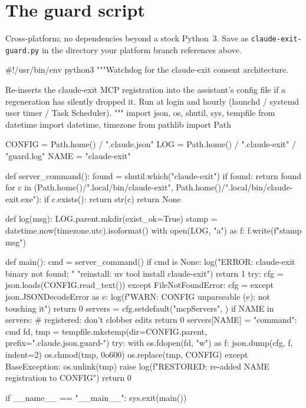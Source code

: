 \documentclass[11pt]{article}
\newenvironment{code}%
  {\quote\small\verbatim}%
  {\endverbatim\endquote}
\begin{document}
\section{The guard script}\label{app:guard}

Cross-platform; no dependencies beyond a stock Python~3.  Save as
\texttt{claude-exit-guard.py} in the directory your platform branch
references above.

\begin{code}
#!/usr/bin/env python3
"""Watchdog for the claude-exit consent architecture.

Re-inserts the claude-exit MCP registration into the assistant's
config file if a regeneration has silently dropped it. Run at login
and hourly (launchd / systemd user timer / Task Scheduler).
"""
import json, os, shutil, sys, tempfile
from datetime import datetime, timezone
from pathlib import Path

CONFIG = Path.home() / ".claude.json"
LOG    = Path.home() / ".claude-exit" / "guard.log"
NAME   = "claude-exit"

def server_command():
    found = shutil.which("claude-exit")
    if found:
        return found
    for c in (Path.home()/".local/bin/claude-exit",
              Path.home()/".local/bin/claude-exit.exe"):
        if c.exists():
            return str(c)
    return None

def log(msg):
    LOG.parent.mkdir(exist_ok=True)
    stamp = datetime.now(timezone.utc).isoformat()
    with open(LOG, "a") as f:
        f.write(f"{stamp} {msg}\n")

def main():
    cmd = server_command()
    if cmd is None:
        log("ERROR: claude-exit binary not found; "
            "reinstall: uv tool install claude-exit")
        return 1
    try:
        cfg = json.loads(CONFIG.read_text())
    except FileNotFoundError:
        cfg = {}
    except json.JSONDecodeError as e:
        log(f"WARN: {CONFIG} unparseable ({e}); not touching it")
        return 0
    servers = cfg.setdefault("mcpServers", {})
    if NAME in servers:          # registered: don't clobber edits
        return 0
    servers[NAME] = {"command": cmd}
    fd, tmp = tempfile.mkstemp(dir=CONFIG.parent,
                               prefix=".claude.json.guard-")
    try:
        with os.fdopen(fd, "w") as f:
            json.dump(cfg, f, indent=2)
        os.chmod(tmp, 0o600)
        os.replace(tmp, CONFIG)
    except BaseException:
        os.unlink(tmp)
        raise
    log(f"RESTORED: re-added {NAME} registration to {CONFIG}")
    return 0

if __name__ == "__main__":
    sys.exit(main())
\end{code}
\end{document}
